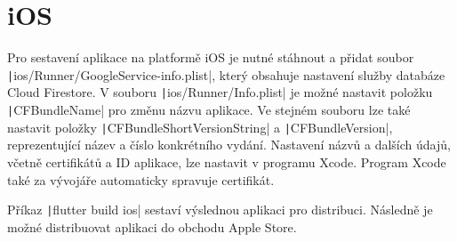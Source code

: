 \section{iOS}
 
Pro sestavení aplikace na platformě iOS je nutné stáhnout a přidat soubor
\texttt|ios/Runner/GoogleService-info.plist|,
který obsahuje nastavení služby databáze Cloud Firestore.
V souboru \texttt|ios/Runner/Info.plist|
je možné nastavit položku \texttt|CFBundleName|
pro změnu názvu aplikace.
Ve stejném souboru lze také nastavit položky
\texttt|CFBundleShortVersionString| a
\texttt|CFBundleVersion|,
reprezentující název a číslo konkrétního vydání.
Nastavení názvů a dalších údajů,
včetně certifikátů a ID aplikace,
lze nastavit v programu Xcode.
Program Xcode také za vývojáře automaticky spravuje certifikát.
\cite{flutter_deploy_ios}

Příkaz \texttt|flutter build ios| sestaví výslednou aplikaci
pro distribuci.
Následně je možné distribuovat aplikaci do obchodu Apple Store.
